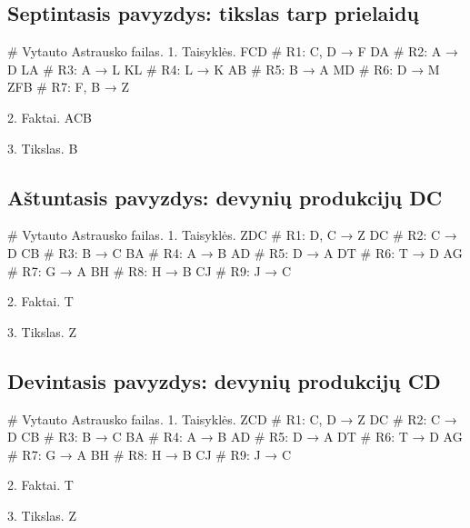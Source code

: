 \subsection{Septintasis pavyzdys: tikslas tarp prielaidų}

\begin{pythonaienv}[fc]
# Vytauto Astrausko failas.
1. Taisyklės.
FCD                                     # R1: C, D → F
DA                                      # R2: A → D
LA                                      # R3: A → L
KL                                      # R4: L → K
AB                                      # R5: B → A
MD                                      # R6: D → M
ZFB                                     # R7: F, B → Z

2. Faktai.
ACB

3. Tikslas.
B
\end{pythonaienv}

\subsection{Aštuntasis pavyzdys: devynių produkcijų DC}

\begin{pythonaienv}[fc]
# Vytauto Astrausko failas.
1. Taisyklės.
ZDC                                     # R1: D, C → Z
DC                                      # R2: C → D
CB                                      # R3: B → C
BA                                      # R4: A → B
AD                                      # R5: D → A
DT                                      # R6: T → D
AG                                      # R7: G → A
BH                                      # R8: H → B
CJ                                      # R9: J → C

2. Faktai.
T

3. Tikslas.
Z
\end{pythonaienv}

\subsection{Devintasis pavyzdys: devynių produkcijų CD}

\begin{pythonaienv}[fc]
# Vytauto Astrausko failas.
1. Taisyklės.
ZCD                                     # R1: C, D → Z
DC                                      # R2: C → D
CB                                      # R3: B → C
BA                                      # R4: A → B
AD                                      # R5: D → A
DT                                      # R6: T → D
AG                                      # R7: G → A
BH                                      # R8: H → B
CJ                                      # R9: J → C

2. Faktai.
T

3. Tikslas.
Z
\end{pythonaienv}

